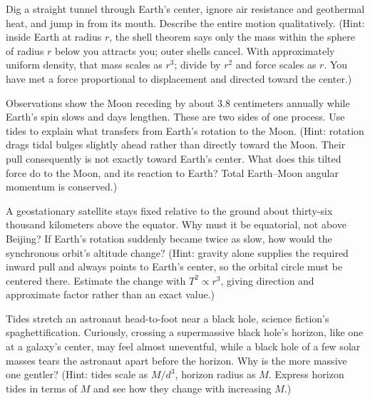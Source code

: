 \begin{puzzles}
\item Dig a straight tunnel through Earth's center, ignore air resistance and geothermal heat, and jump in from its mouth. Describe the entire motion qualitatively. (Hint: inside Earth at radius \(r\), the shell theorem says only the mass within the sphere of radius \(r\) below you attracts you; outer shells cancel. With approximately uniform density, that mass scales as \(r^{3}\); divide by \(r^{2}\) and force scales as \(r\). You have met a force proportional to displacement and directed toward the center.)

\item Observations show the Moon receding by about \(3.8\) centimeters annually while Earth's spin slows and days lengthen. These are two sides of one process. Use tides to explain what transfers from Earth's rotation to the Moon. (Hint: rotation drags tidal bulges slightly ahead rather than directly toward the Moon. Their pull consequently is not exactly toward Earth's center. What does this tilted force do to the Moon, and its reaction to Earth? Total Earth--Moon angular momentum is conserved.)

\item A geostationary satellite stays fixed relative to the ground about thirty-six thousand kilometers above the equator. Why must it be equatorial, not above Beijing? If Earth's rotation suddenly became twice as slow, how would the synchronous orbit's altitude change? (Hint: gravity alone supplies the required inward pull and always points to Earth's center, so the orbital circle must be centered there. Estimate the change with \(T^{2}\propto r^{3}\), giving direction and approximate factor rather than an exact value.)

\item Tides stretch an astronaut head-to-foot near a black hole, science fiction's spaghettification. Curiously, crossing a supermassive black hole's horizon, like one at a galaxy's center, may feel almost uneventful, while a black hole of a few solar masses tears the astronaut apart before the horizon. Why is the more massive one gentler? (Hint: tides scale as \(M/d^{3}\), horizon radius as \(M\). Express horizon tides in terms of \(M\) and see how they change with increasing \(M\).)
\end{puzzles}

